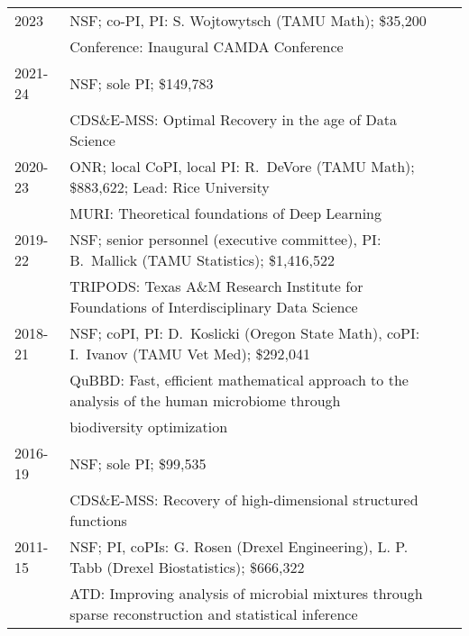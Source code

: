 \documentclass[11pt]{article}
\begin{document}
\begin{tabular}{lll}
2023 & NSF; co-PI,  PI: S. Wojtowytsch (TAMU Math); \$35,200\\
& \hspace{-15mm}
{\small Conference:} Inaugural CAMDA Conference\\
2021-24 & NSF; sole PI; \$149,783\\
& \hspace{-15mm}
{\small CDS\&E-MSS:} Optimal Recovery in the age of Data Science\\
2020-23 & ONR; local CoPI, local PI: R.~DeVore (TAMU Math); \$883,622;
Lead: Rice University\\
& \hspace{-15mm}
{\small MURI:} Theoretical foundations of Deep Learning \\
2019-22 & NSF; senior personnel (executive committee), PI: B.~Mallick (TAMU  Statistics);  \$1,416,522 \\
& \hspace{-15mm}
{\small TRIPODS:} Texas A\&M Research Institute for Foundations of Interdisciplinary Data Science\\
2018-21 & NSF; coPI, PI: D.~Koslicki (Oregon State Math), coPI: I.~Ivanov (TAMU Vet Med); 
\$292,041 \\
& \hspace{-15mm}
{\small QuBBD:} Fast, efficient mathematical approach to the analysis of the
human microbiome through\\ 
& \hspace{-15mm} biodiversity optimization\\
2016-19 & NSF; sole PI;
\$99,535 
\\
& \hspace{-15mm}
{\small CDS\&E-MSS:} Recovery of high-dimensional structured functions
\\
2011-15 & NSF; PI, coPIs: G. Rosen (Drexel Engineering), L. P. Tabb (Drexel Biostatistics); 
\$666,322\\
& \hspace{-15mm}
{\small ATD:} Improving analysis of microbial mixtures through sparse
reconstruction and statistical inference
\end{tabular}
\end{document}
